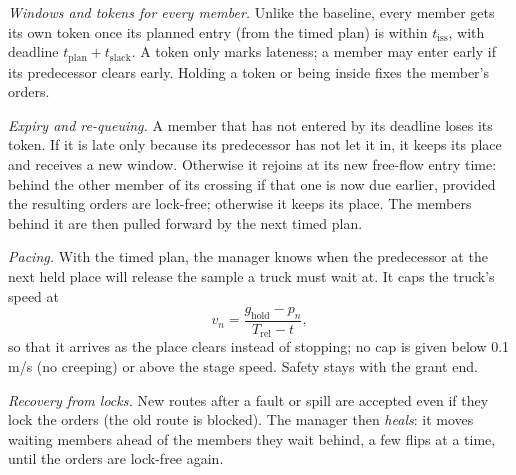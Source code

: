 \documentclass[conference]{IEEEtran}
\begin{document}
\emph{Windows and tokens for every member.} Unlike the baseline, every member
gets its own token once its planned entry (from the timed plan) is within
$t_{\mathrm{iss}}$, with deadline $t_{\mathrm{plan}}+t_{\mathrm{slack}}$. A
token only marks lateness; a member may enter early if its predecessor clears
early. Holding a token or being inside fixes the member's orders.

\emph{Expiry and re-queuing.} A member that has not entered by its deadline
loses its token. If it is late only because its predecessor has not let it in,
it keeps its place and receives a new window. Otherwise it rejoins at its new
free-flow entry time: behind the other member of its crossing if that one is
now due earlier, provided the resulting orders are lock-free; otherwise it
keeps its place. The members behind it are then pulled forward by the next
timed plan.

\emph{Pacing.} With the timed plan, the manager knows when the predecessor at
the next held place will release the sample a truck must wait at. It caps the
truck's speed at
\begin{equation}
v_n=\frac{g_{\mathrm{hold}}-p_n}{T_{\mathrm{rel}}-t},
\label{eq:pace}
\end{equation}
so that it arrives as the place clears instead of stopping; no cap is given
below 0.1\,m/s (no creeping) or above the stage speed. Safety stays with the
grant end.

\emph{Recovery from locks.} New routes after a fault or spill are accepted
even if they lock the orders (the old route is blocked). The manager then
\emph{heals}: it moves waiting members ahead of the members they wait behind,
a few flips at a time, until the orders are lock-free again.
\end{document}
